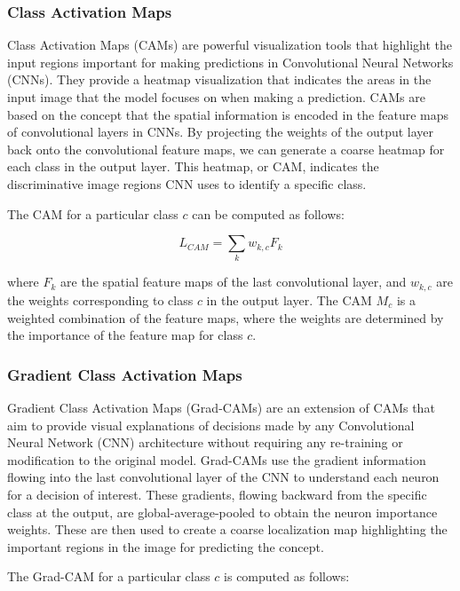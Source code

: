 \subsubsection{Class Activation Maps}

Class Activation Maps (CAMs) are powerful visualization tools that highlight the input regions important for making predictions in Convolutional Neural Networks (CNNs). They provide a heatmap visualization that indicates the areas in the input image that the model focuses on when making a prediction. CAMs are based on the concept that the spatial information is encoded in the feature maps of convolutional layers in CNNs. By projecting the weights of the output layer back onto the convolutional feature maps, we can generate a coarse heatmap for each class in the output layer. This heatmap, or CAM, indicates the discriminative image regions CNN uses to identify a specific class.

The CAM for a particular class $c$ can be computed as follows:

\begin{equation}
    L_{CAM} = \sum_k w_{k,c} F_k
\end{equation}

where $F_k$ are the spatial feature maps of the last convolutional layer, and $w_{k,c}$ are the weights corresponding to class $c$ in the output layer. The CAM $M_c$ is a weighted combination of the feature maps, where the weights are determined by the importance of the feature map for class $c$.

\subsubsection{Gradient Class Activation Maps}

Gradient Class Activation Maps (Grad-CAMs) are an extension of CAMs that aim to provide visual explanations of decisions made by any Convolutional Neural Network (CNN) architecture without requiring any re-training or modification to the original model. Grad-CAMs use the gradient information flowing into the last convolutional layer of the CNN to understand each neuron for a decision of interest. These gradients, flowing backward from the specific class at the output, are global-average-pooled to obtain the neuron importance weights. These are then used to create a coarse localization map highlighting the important regions in the image for predicting the concept.

The Grad-CAM for a particular class $c$ is computed as follows:

